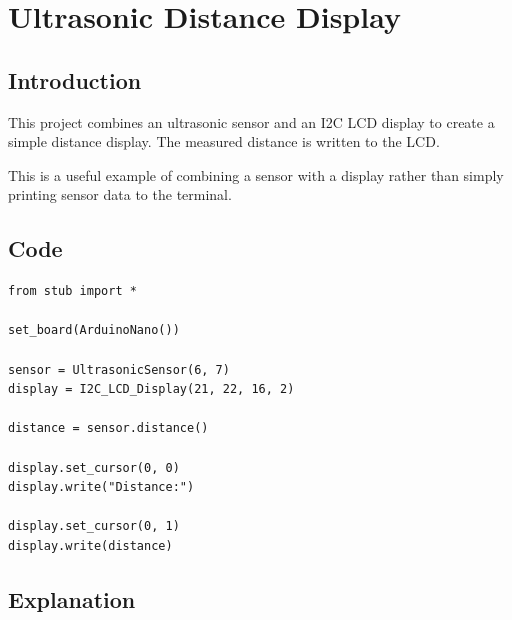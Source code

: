 \newpage

\section{Ultrasonic Distance Display}

\subsection{Introduction}

This project combines an ultrasonic sensor and an I2C LCD display to create
a simple distance display. The measured distance is written to the LCD.

This is a useful example of combining a sensor with a display rather than
simply printing sensor data to the terminal.

\subsection{Code}

\begin{lstlisting}
from stub import *

set_board(ArduinoNano())

sensor = UltrasonicSensor(6, 7)
display = I2C_LCD_Display(21, 22, 16, 2)

distance = sensor.distance()

display.set_cursor(0, 0)
display.write("Distance:")

display.set_cursor(0, 1)
display.write(distance)
\end{lstlisting}

\subsection{Explanation}

